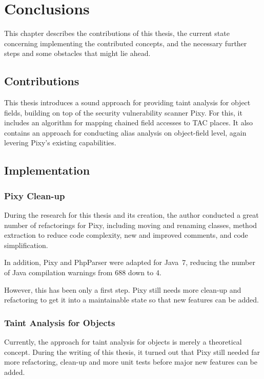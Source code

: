 \chapter{Conclusions}
\label{conclusions}

This chapter describes the contributions of this thesis, the current state concerning implementing the contributed concepts, and the necessary further steps and some obstacles that might lie ahead.

\section{Contributions}

This thesis introduces a sound approach for providing taint analysis for object fields, building on top of the security vulnerability scanner Pixy. For this, it includes an algorithm for mapping chained field accesses to TAC places. It also contains an approach for conducting alias analysis on object-field level, again levering Pixy's existing capabilities.


\section{Implementation}

\subsection{Pixy Clean-up}

During the research for this thesis and its creation, the author conducted a great number of refactorings for Pixy, including moving and renaming classes, method extraction to reduce code complexity, new and improved comments, and code simplification.

In addition, Pixy and PhpParser were adapted for Java~7, reducing the number of Java compilation warnings from 688 down to 4.

However, this has been only a first step. Pixy still needs more clean-up and refactoring to get it into a maintainable state so that new features can be added.


\subsection{Taint Analysis for Objects}

Currently, the approach for taint analysis for objects is merely a theoretical concept. During the writing of this thesis, it turned out that Pixy still needed far more refactoring, clean-up and more unit tests before major new features can be added.



